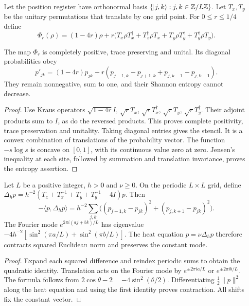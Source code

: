 Let the position register have orthonormal basis $\{|j,k\rangle: j,k\in\mathbb{Z}/L\mathbb{Z}\}$. Let $T_x,T_y$ be the unitary permutations that translate by one grid point. For $0\le r\le1/4$ define
\[
 \Phi_r(\rho)=(1-4r)\rho+r\bigl(T_x\rho T_x^\dagger+T_x^\dagger\rho T_x
                    +T_y\rho T_y^\dagger+T_y^\dagger\rho T_y\bigr).
\]

\begin{proposition}
\label{prop:fluid-heat-channel}
The map $\Phi_r$ is completely positive, trace preserving and unital. Its diagonal probabilities obey
\[
 p'_{jk}=(1-4r)p_{jk}+r(p_{j-1,k}+p_{j+1,k}+p_{j,k-1}+p_{j,k+1}).
\]
They remain nonnegative, sum to one, and their Shannon entropy cannot decrease.
\end{proposition}
\begin{proof}
Use Kraus operators $\sqrt{1-4r}I$, $\sqrt r T_x$, $\sqrt r T_x^\dagger$, $\sqrt r T_y$, $\sqrt r T_y^\dagger$. Their adjoint products sum to $I$, as do the reversed products. This proves complete positivity, trace preservation and unitality. Taking diagonal entries gives the stencil. It is a convex combination of translations of the probability vector. The function $-s\log s$ is concave on $[0,1]$, with its continuous value zero at zero. Jensen's inequality at each site, followed by summation and translation invariance, proves the entropy assertion.
\end{proof}

\begin{proposition}
\label{prop:fluid-heat-spectrum}
Let $L$ be a positive integer, $h>0$ and $\nu\ge0$. On the periodic $L\times L$ grid, define $\Delta_h p=h^{-2}(T_x+T_x^{-1}+T_y+T_y^{-1}-4I)p$. Then
\[
 -\langle p,\Delta_h p\rangle
 =h^{-2}\sum_{j,k}\bigl((p_{j+1,k}-p_{jk})^2+(p_{j,k+1}-p_{jk})^2\bigr).
\]
The Fourier mode $e^{2\pi i(aj+bk)/L}$ has eigenvalue
$-4h^{-2}[\sin^2(\pi a/L)+\sin^2(\pi b/L)]$.
The heat equation $\dot p=\nu\Delta_hp$ therefore contracts squared Euclidean norm and preserves the constant mode.
\end{proposition}
\begin{proof}
Expand each squared difference and reindex periodic sums to obtain the quadratic identity. Translation acts on the Fourier mode by $e^{\pm2\pi ia/L}$ or $e^{\pm2\pi ib/L}$. The formula follows from $2\cos\theta-2=-4\sin^2(\theta/2)$. Differentiating $\tfrac12\|p\|^2$ along the heat equation and using the first identity proves contraction. All shifts fix the constant vector.
\end{proof}


